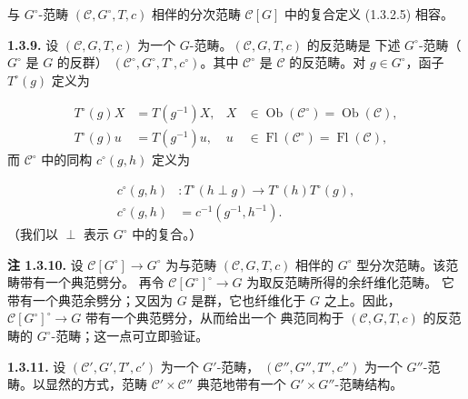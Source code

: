 \clearpage
{}%
与 $G^\circ$-范畴 $(\mathcal C,G^\circ,T,c)$ 相伴的分次范畴
$\mathcal C[G]$ 中的复合定义 (1.3.2.5) 相容。

\noindent\textbf{1.3.9.}\quad
设 $(\mathcal C,G,T,c)$ 为一个 $G$-范畴。$(\mathcal C,G,T,c)$ 的反范畴是
下述 $G^\circ$-范畴（$G^\circ$ 是 $G$ 的反群）
$(\mathcal C^\circ,G^\circ,T^\circ,c^\circ)$。其中 $\mathcal C^\circ$ 是
$\mathcal C$ 的反范畴。对 $g\in G^\circ$，函子 $T^\circ(g)$ 定义为

\begin{equation}
  \begin{aligned}
    T^\circ(g)X &= T(g^{-1})X,
      & X&\in\operatorname{Ob}(\mathcal C^\circ)
             =\operatorname{Ob}(\mathcal C),\\
    T^\circ(g)u &= T(g^{-1})u,
      & u&\in\operatorname{Fl}(\mathcal C^\circ)
             =\operatorname{Fl}(\mathcal C),
  \end{aligned}
  \tag{1.3.9.1}
\end{equation}
而 $\mathcal C^\circ$ 中的同构 $c^\circ(g,h)$ 定义为

\begin{equation}
  \begin{aligned}
    c^\circ(g,h)&\colon
      T^\circ(h\perp g)\longrightarrow T^\circ(h)T^\circ(g),\\
    c^\circ(g,h)&=c^{-1}(g^{-1},h^{-1}).
  \end{aligned}
  \tag{1.3.9.2}
\end{equation}
（我们以 $\perp$ 表示 $G^\circ$ 中的复合。）

\noindent\textbf{注 1.3.10.}\quad
设 $\mathcal C[G^\circ]\longrightarrow G^\circ$ 为与范畴
$(\mathcal C,G,T,c)$ 相伴的 $G^\circ$ 型分次范畴。该范畴带有一个典范劈分。
再令 $\mathcal C[G^\circ]^\circ\longrightarrow G$ 为取反范畴所得的余纤维化范畴。
它带有一个典范余劈分；又因为 $G$ 是群，它也纤维化于 $G$ 之上。因此，
$\mathcal C[G^\circ]^\circ\longrightarrow G$ 带有一个典范劈分，从而给出一个
典范同构于 $(\mathcal C,G,T,c)$ 的反范畴的 $G^\circ$-范畴；这一点可立即验证。

\noindent\textbf{1.3.11.}\quad
设 $(\mathcal C',G',T',c')$ 为一个 $G'$-范畴，
$(\mathcal C'',G'',T'',c'')$ 为一个 $G''$-范畴。以显然的方式，范畴
$\mathcal C'\times\mathcal C''$ 典范地带有一个 $G'\times G''$-范畴结构。


